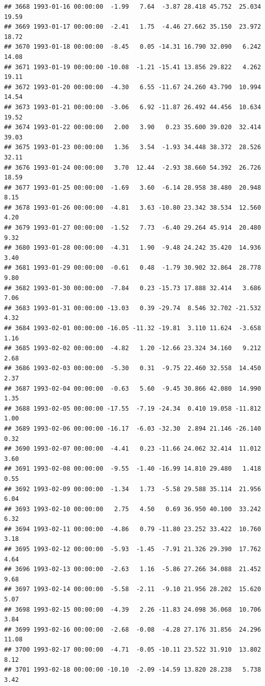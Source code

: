 \documentclass{article}\usepackage{graphicx, color}
\makeatletter
\newenvironment{kframe}{%
 \def\at@end@of@kframe{}%
 \ifinner\ifhmode%
  \def\at@end@of@kframe{\end{minipage}}%
  \begin{minipage}{\columnwidth}%
 \fi\fi%
 \def\FrameCommand##1{\hskip\@totalleftmargin \hskip-\fboxsep
 \colorbox{shadecolor}{##1}\hskip-\fboxsep
     \hskip-\linewidth \hskip-\@totalleftmargin \hskip\columnwidth}%
 \MakeFramed {\advance\hsize-\width
   \@totalleftmargin\z@ \linewidth\hsize
   \@setminipage}}%
 {\par\unskip\endMakeFramed%
 \at@end@of@kframe}
\newenvironment{knitrout}{}{} %
\makeatother
\begin{document}
\begin{knitrout}
\begin{kframe}
\begin{verbatim}
## 3668 1993-01-16 00:00:00  -1.99   7.64  -3.87 28.418 45.752  25.034  19.59
## 3669 1993-01-17 00:00:00  -2.41   1.75  -4.46 27.662 35.150  23.972  18.72
## 3670 1993-01-18 00:00:00  -8.45   0.05 -14.31 16.790 32.090   6.242  14.08
## 3671 1993-01-19 00:00:00 -10.08  -1.21 -15.41 13.856 29.822   4.262  19.11
## 3672 1993-01-20 00:00:00  -4.30   6.55 -11.67 24.260 43.790  10.994  14.54
## 3673 1993-01-21 00:00:00  -3.06   6.92 -11.87 26.492 44.456  10.634  19.52
## 3674 1993-01-22 00:00:00   2.00   3.90   0.23 35.600 39.020  32.414  39.03
## 3675 1993-01-23 00:00:00   1.36   3.54  -1.93 34.448 38.372  28.526  32.11
## 3676 1993-01-24 00:00:00   3.70  12.44  -2.93 38.660 54.392  26.726  18.59
## 3677 1993-01-25 00:00:00  -1.69   3.60  -6.14 28.958 38.480  20.948   8.15
## 3678 1993-01-26 00:00:00  -4.81   3.63 -10.80 23.342 38.534  12.560   4.20
## 3679 1993-01-27 00:00:00  -1.52   7.73  -6.40 29.264 45.914  20.480   9.32
## 3680 1993-01-28 00:00:00  -4.31   1.90  -9.48 24.242 35.420  14.936   3.40
## 3681 1993-01-29 00:00:00  -0.61   0.48  -1.79 30.902 32.864  28.778   9.80
## 3682 1993-01-30 00:00:00  -7.84   0.23 -15.73 17.888 32.414   3.686   7.06
## 3683 1993-01-31 00:00:00 -13.03   0.39 -29.74  8.546 32.702 -21.532   4.32
## 3684 1993-02-01 00:00:00 -16.05 -11.32 -19.81  3.110 11.624  -3.658   1.16
## 3685 1993-02-02 00:00:00  -4.82   1.20 -12.66 23.324 34.160   9.212   2.68
## 3686 1993-02-03 00:00:00  -5.30   0.31  -9.75 22.460 32.558  14.450   2.37
## 3687 1993-02-04 00:00:00  -0.63   5.60  -9.45 30.866 42.080  14.990   1.35
## 3688 1993-02-05 00:00:00 -17.55  -7.19 -24.34  0.410 19.058 -11.812   1.00
## 3689 1993-02-06 00:00:00 -16.17  -6.03 -32.30  2.894 21.146 -26.140   0.32
## 3690 1993-02-07 00:00:00  -4.41   0.23 -11.66 24.062 32.414  11.012   3.60
## 3691 1993-02-08 00:00:00  -9.55  -1.40 -16.99 14.810 29.480   1.418   0.55
## 3692 1993-02-09 00:00:00  -1.34   1.73  -5.58 29.588 35.114  21.956   6.04
## 3693 1993-02-10 00:00:00   2.75   4.50   0.69 36.950 40.100  33.242   6.32
## 3694 1993-02-11 00:00:00  -4.86   0.79 -11.80 23.252 33.422  10.760   3.18
## 3695 1993-02-12 00:00:00  -5.93  -1.45  -7.91 21.326 29.390  17.762   4.64
## 3696 1993-02-13 00:00:00  -2.63   1.16  -5.86 27.266 34.088  21.452   9.68
## 3697 1993-02-14 00:00:00  -5.58  -2.11  -9.10 21.956 28.202  15.620   5.07
## 3698 1993-02-15 00:00:00  -4.39   2.26 -11.83 24.098 36.068  10.706   3.84
## 3699 1993-02-16 00:00:00  -2.68  -0.08  -4.28 27.176 31.856  24.296  11.08
## 3700 1993-02-17 00:00:00  -4.71  -0.05 -10.11 23.522 31.910  13.802   8.12
## 3701 1993-02-18 00:00:00 -10.10  -2.09 -14.59 13.820 28.238   5.738   3.42

\end{verbatim}
\end{kframe}
\end{knitrout}
\end{document}
